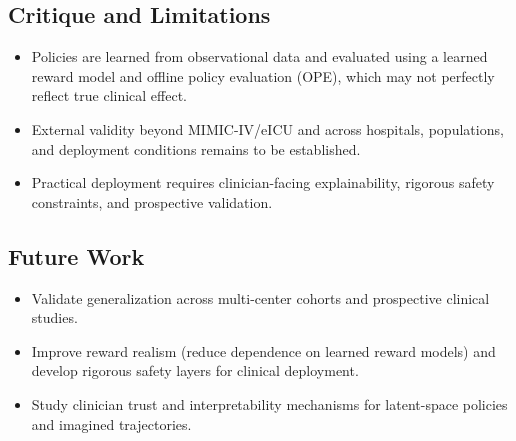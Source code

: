 \subsection*{Critique and Limitations}
\begin{itemize}
    \item Policies are learned from observational data and evaluated using a learned reward model and offline policy evaluation (OPE), which may not perfectly reflect true clinical effect.
    \item External validity beyond MIMIC-IV/eICU and across hospitals, populations, and deployment conditions remains to be established.
    \item Practical deployment requires clinician-facing explainability, rigorous safety constraints, and prospective validation.
\end{itemize}

\subsection*{Future Work}
\begin{itemize}
    \item Validate generalization across multi-center cohorts and prospective clinical studies.
    \item Improve reward realism (reduce dependence on learned reward models) and develop rigorous safety layers for clinical deployment.
    \item Study clinician trust and interpretability mechanisms for latent-space policies and imagined trajectories.
\end{itemize}
